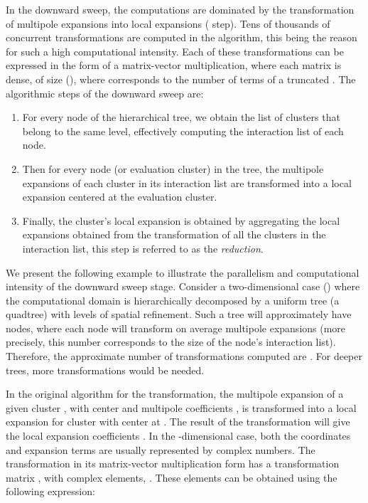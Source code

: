 In the downward sweep, the computations are dominated by the transformation of multipole expansions into local expansions ({\ML} step). Tens of thousands of concurrent {\ML} transformations are computed in the {\fmm} algorithm, this being the reason for such a high computational intensity. Each of these transformations can be expressed in the form of a matrix-vector multiplication, where each matrix is dense, of size (), where  corresponds to the number of terms of a truncated {\ME}. 
The algorithmic steps of the downward sweep are: 
\begin{enumerate}
\item For every node of the hierarchical tree, we obtain the list of clusters that belong to the same level, effectively computing the interaction list of each node. 
\item Then for every node (or evaluation cluster) in the tree, the multipole expansions of each cluster in its interaction list are transformed into a local expansion centered at the evaluation cluster.
\item Finally, the cluster's local expansion is obtained by aggregating the local expansions obtained from the {\ML} transformation of all the clusters in the interaction list, this step is referred to as the \emph{reduction}.
\end{enumerate}

We present the following example to illustrate the parallelism and computational intensity of the downward sweep stage. Consider a two-dimensional case () where the computational domain is hierarchically decomposed by a uniform tree (a quadtree) with  levels of spatial refinement. Such a tree will approximately have  nodes, where each node will transform on average  multipole expansions (more precisely, this number corresponds to the size of the node's interaction list). Therefore, the approximate number of {\ML} transformations computed are . For deeper trees, more transformations would be needed. 

In the original algorithm for the {\ML} transformation, the multipole expansion of a given cluster , with center  and multipole coefficients , is transformed into a local expansion for cluster  with center at . The result of the transformation will give the local expansion coefficients . In the -dimensional case, both the coordinates and expansion terms are usually represented by complex numbers. The {\ML} transformation in its matrix-vector multiplication form has a transformation matrix , with  complex elements, . These elements can be obtained using the following expression:
 

